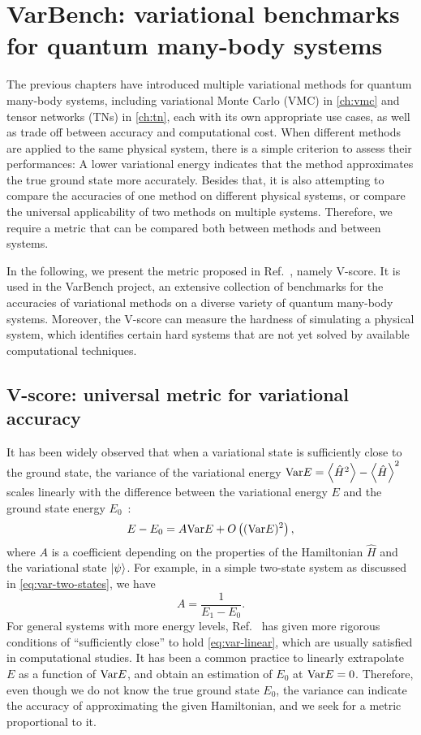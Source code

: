 \chapter{VarBench: variational benchmarks for quantum many-body systems}
\label{ch:varbench}

The previous chapters have introduced multiple variational methods for quantum many-body systems, including variational Monte Carlo (VMC) in \cref{ch:vmc} and tensor networks (TNs) in \cref{ch:tn}, each with its own appropriate use cases, as well as trade off between accuracy and computational cost. When different methods are applied to the same physical system, there is a simple criterion to assess their performances: A lower variational energy indicates that the method approximates the true ground state more accurately. Besides that, it is also attempting to compare the accuracies of one method on different physical systems, or compare the universal applicability of two methods on multiple systems. Therefore, we require a metric that can be compared both between methods and between systems.

In the following, we present the metric proposed in Ref.~\cite{wu2023variational}, namely V-score. It is used in the VarBench project, an extensive collection of benchmarks for the accuracies of variational methods on a diverse variety of quantum many-body systems. Moreover, the V-score can measure the hardness of simulating a physical system, which identifies certain hard systems that are not yet solved by available computational techniques.

\section{V-score: universal metric for variational accuracy}

It has been widely observed that when a variational state is sufficiently close to the ground state, the variance of the variational energy $\Var E = \ev{\hat{H}^2} - \ev{\hat{H}}^2$ scales linearly with the difference between the variational energy $E$ and the ground state energy $E_0$~\cite{kwon1993, imada2000, sorella2001}:
\begin{equation}
E  - E_0 = A \mathrm{Var} E + O\left( (\mathrm{Var} E)^2 \right),
\label{eq:var-linear}
\end{equation}
where $A$ is a coefficient depending on the properties of the Hamiltonian $\hat{H}$ and the variational state $\ket{\psi}$. For example, in a simple two-state system as discussed in \cref{eq:var-two-states}, we have
\begin{equation}
A = \frac{1}{E_1 - E_0}.
\end{equation}
For general systems with more energy levels, Ref.~\cite{taddei2015iterative} has given more rigorous conditions of ``sufficiently close'' to hold \cref{eq:var-linear}, which are usually satisfied in computational studies. It has been a common practice to linearly extrapolate $E$ as a function of $\mathrm{Var} E$, and obtain an estimation of $E_0$ at $\mathrm{Var} E = 0$. Therefore, even though we do not know the true ground state $E_0$, the variance can indicate the accuracy of approximating the given Hamiltonian, and we seek for a metric proportional to it.

